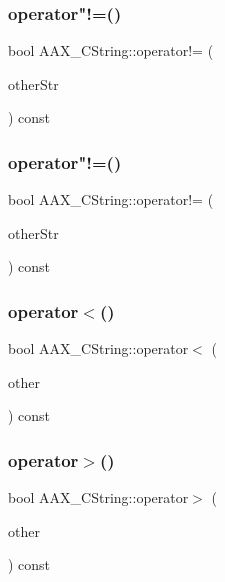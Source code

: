 \subsubsection{\texorpdfstring{operator"!=()}{operator!=()}\hspace{0.1cm}{\footnotesize\ttfamily [2/3]}}
{\footnotesize\ttfamily bool A\+A\+X\+\_\+\+C\+String\+::operator!= (\begin{DoxyParamCaption}\item[{const char $\ast$}]{other\+Str }\end{DoxyParamCaption}) const}

\mbox{\label{a01573_ad720bf87d4996cdcd26b09c314580a74}} 
\subsubsection{\texorpdfstring{operator"!=()}{operator!=()}\hspace{0.1cm}{\footnotesize\ttfamily [3/3]}}
{\footnotesize\ttfamily bool A\+A\+X\+\_\+\+C\+String\+::operator!= (\begin{DoxyParamCaption}\item[{const std\+::string \&}]{other\+Str }\end{DoxyParamCaption}) const}

\mbox{\label{a01573_a6999d2cb8a766952f5764974f7d8badb}} 
\subsubsection{\texorpdfstring{operator$<$()}{operator<()}}
{\footnotesize\ttfamily bool A\+A\+X\+\_\+\+C\+String\+::operator$<$ (\begin{DoxyParamCaption}\item[{const \mbox{\hyperlink{a01573}{A\+A\+X\+\_\+\+C\+String}} \&}]{other }\end{DoxyParamCaption}) const}

\mbox{\label{a01573_adb13137e2541a0f32494f07d702493ae}} 
\subsubsection{\texorpdfstring{operator$>$()}{operator>()}}
{\footnotesize\ttfamily bool A\+A\+X\+\_\+\+C\+String\+::operator$>$ (\begin{DoxyParamCaption}\item[{const \mbox{\hyperlink{a01573}{A\+A\+X\+\_\+\+C\+String}} \&}]{other }\end{DoxyParamCaption}) const}

